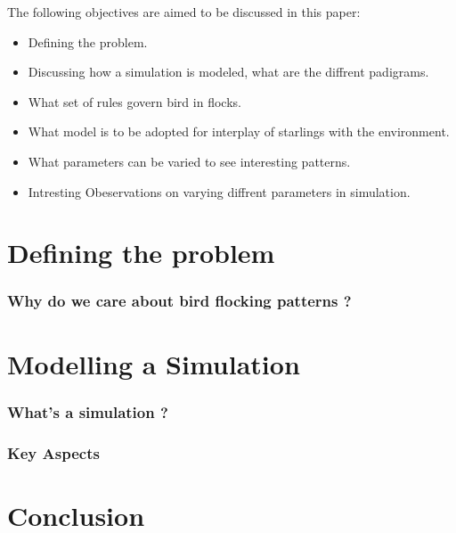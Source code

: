 \documentclass[12pt]{report}
\begin{document}
\vspace{0.5cm}

The following objectives are aimed to be discussed in this paper:
\begin{itemize}
  \item
  Defining the problem.
  \item
  Discussing how a simulation is modeled, what are the diffrent padigrams.

  \item
  What set of rules govern bird in flocks.
  \item
  What model is to be adopted for interplay of starlings with the environment.
  \item
  What parameters can be varied to see interesting patterns.
  \item
  Intresting Obeservations on varying diffrent parameters in simulation.
\end{itemize}

\chapter{Defining the problem}
\subsection{Why do we care about bird flocking patterns ?}

\chapter{Modelling a Simulation}
\subsection{What's a simulation ?}
\subsection{Key Aspects}


\chapter{Conclusion}







\end{document}
